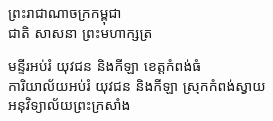 \documentclass[a4paper,10pt]{article}
\newcommand{\khmflourish}{{\Tacteing\fontsize{17pt}{17pt}\selectfont 3}}
\begin{document}
\fontsize{10pt}{15.0pt}\selectfont

{\centering
  {\muol\fontsize{11pt}{16pt}\selectfont ព្រះរាជាណាចក្រកម្ពុជា}\\[2pt]
  {\muol\fontsize{11pt}{16pt}\selectfont ជាតិ សាសនា ព្រះមហាក្សត្រ}\\[-2pt]
  \khmflourish\par
}
\vspace{-4pt}
{\muol\fontsize{10pt}{15.2pt}\selectfont
មន្ទីរអប់រំ យុវជន និងកីឡា ខេត្តកំពង់ធំ\\
ការិយាល័យអប់រំ យុវជន និងកីឡា ស្រុកកំពង់ស្វាយ\\
អនុវិទ្យាល័យព្រះក្រសាំង\par}

\vspace{2pt}
{\par}
\vspace{2pt}
\end{document}
